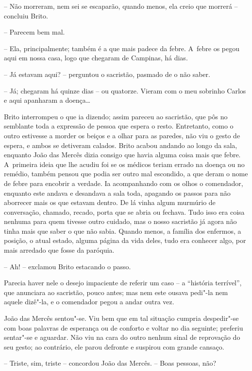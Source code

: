 -- Não morreram, nem sei se escaparão, quando menos, ela creio que
morrerá -- concluiu Brito.

-- Parecem bem mal.

-- Ela, principalmente; também é a que mais padece da febre. A~febre os
pegou aqui em nossa casa, logo que chegaram de Campinas, há dias.

-- Já estavam aqui? -- perguntou o sacristão, pasmado de o não saber.

-- Já; chegaram há quinze dias -- ou quatorze. Vieram com o meu sobrinho
Carlos e aqui apanharam a doença\ldots{}

Brito interrompeu o que ia dizendo; assim pareceu ao sacristão, que pôs
no semblante toda a expressão de pessoa que espera o resto. Entretanto,
como o outro estivesse a morder os beiços e a olhar para as paredes, não
viu o gesto de espera, e ambos se detiveram calados. Brito acabou
andando ao longo da sala, enquanto João das Mercês dizia consigo que
havia alguma coisa mais que febre. A~primeira ideia que lhe acudiu foi
se os médicos teriam errado na doença ou no remédio, também pensou que
podia ser outro mal escondido, a que deram o nome de febre para encobrir
a verdade. Ia acompanhando com os olhos o comendador, enquanto este
andava e desandava a sala toda, apagando os passos para não aborrecer
mais os que estavam dentro. De lá vinha algum murmúrio de conversação,
chamado, recado, porta que se abria ou fechava. Tudo isso era coisa
nenhuma para quem tivesse outro cuidado, mas o nosso sacristão já agora
não tinha mais que saber o que não sabia. Quando menos, a família dos
enfermos, a posição, o atual estado, alguma página da vida deles, tudo
era conhecer algo, por mais arredado que fosse da paróquia.

-- Ah! -- exclamou Brito estacando o passo.

Parecia haver nele o desejo impaciente de referir um caso -- a
``história terrível'', que anunciara ao sacristão, pouco antes; mas nem
este ousava pedi"-la nem aquele dizê"-la, e o comendador pegou a andar
outra vez.

João das Mercês sentou"-se. Viu bem que em tal situação cumpria
despedir"-se com boas palavras de esperança ou de conforto e voltar no
dia seguinte; preferiu sentar"-se e aguardar. Não viu na cara do outro
nenhum sinal de reprovação do seu gesto; ao contrário, ele parou
defronte e suspirou com grande cansaço.

-- Triste, sim, triste -- concordou João das Mercês. -- Boas pessoas,
não?

